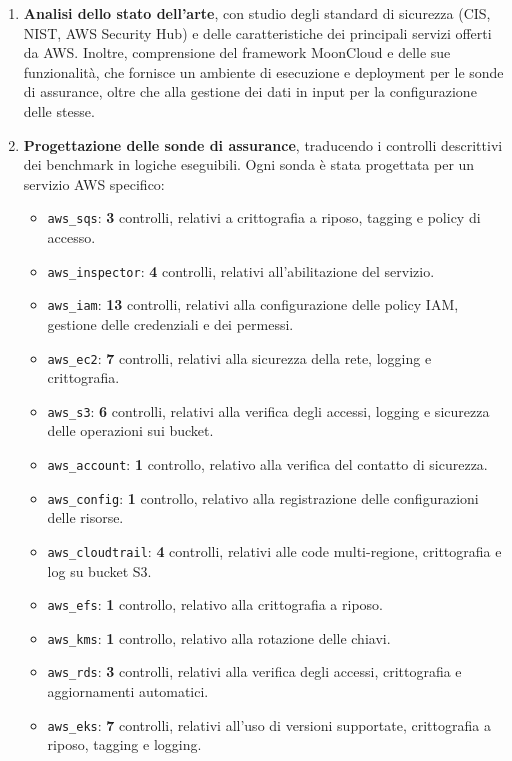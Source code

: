 \documentclass[11pt,a4paper]{article}
\begin{document}
\begin{enumerate}
  \item \textbf{Analisi dello stato dell'arte}, con studio degli standard di sicurezza (CIS, NIST, AWS Security Hub) e delle caratteristiche dei principali servizi offerti da AWS. Inoltre, comprensione del framework MoonCloud e delle sue funzionalità, che fornisce un ambiente di esecuzione e deployment per le sonde di assurance, oltre che alla gestione dei dati in input per la configurazione delle stesse.
  
  \item \textbf{Progettazione delle sonde di assurance}, traducendo i controlli descrittivi dei benchmark in logiche eseguibili. Ogni sonda è stata progettata per un servizio AWS specifico:
  \begin{itemize}
    \item \texttt{aws\_sqs}: \textbf{3} controlli, relativi a crittografia a riposo, tagging e policy di accesso.
    \item \texttt{aws\_inspector}: \textbf{4} controlli, relativi all'abilitazione del servizio.
    \item \texttt{aws\_iam}: \textbf{13} controlli, relativi alla configurazione delle policy IAM, gestione delle credenziali e dei permessi.
    \item \texttt{aws\_ec2}: \textbf{7} controlli, relativi alla sicurezza della rete, logging e crittografia.
    \item \texttt{aws\_s3}: \textbf{6} controlli, relativi alla verifica degli accessi, logging e sicurezza delle operazioni sui bucket.
    \item \texttt{aws\_account}: \textbf{1} controllo, relativo alla verifica del contatto di sicurezza.
    \item \texttt{aws\_config}: \textbf{1} controllo, relativo alla registrazione delle configurazioni delle risorse.
    \item \texttt{aws\_cloudtrail}: \textbf{4} controlli, relativi alle code multi-regione, crittografia e log su bucket S3.
    \item \texttt{aws\_efs}: \textbf{1} controllo, relativo alla crittografia a riposo.
    \item \texttt{aws\_kms}: \textbf{1} controllo, relativo alla rotazione delle chiavi.
    \item \texttt{aws\_rds}: \textbf{3} controlli, relativi alla verifica degli accessi, crittografia e aggiornamenti automatici.
    \item \texttt{aws\_eks}: \textbf{7} controlli, relativi all'uso di versioni supportate, crittografia a riposo, tagging e logging.
  \end{itemize}
  

\end{enumerate}
\end{document}
